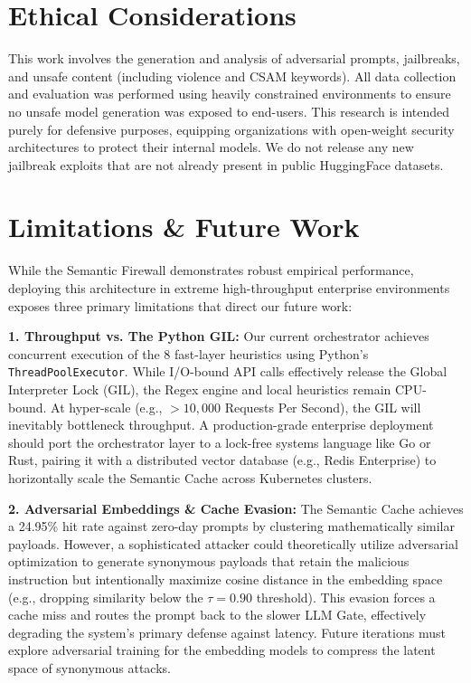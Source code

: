 \documentclass[12pt,a4paper]{article}
\begin{document}
\section{Ethical Considerations}

This work involves the generation and analysis of adversarial prompts, jailbreaks, and unsafe content (including violence and CSAM keywords). All data collection and evaluation was performed using heavily constrained environments to ensure no unsafe model generation was exposed to end-users. This research is intended purely for defensive purposes, equipping organizations with open-weight security architectures to protect their internal models. We do not release any new jailbreak exploits that are not already present in public HuggingFace datasets.

\section{Limitations \& Future Work}

While the Semantic Firewall demonstrates robust empirical performance, deploying this architecture in extreme high-throughput enterprise environments exposes three primary limitations that direct our future work:

\textbf{1. Throughput vs. The Python GIL:} Our current orchestrator achieves concurrent execution of the 8 fast-layer heuristics using Python's \texttt{ThreadPoolExecutor}. While I/O-bound API calls effectively release the Global Interpreter Lock (GIL), the Regex engine and local heuristics remain CPU-bound. At hyper-scale (e.g., $>10{,}000$ Requests Per Second), the GIL will inevitably bottleneck throughput. A production-grade enterprise deployment should port the orchestrator layer to a lock-free systems language like Go or Rust, pairing it with a distributed vector database (e.g., Redis Enterprise) to horizontally scale the Semantic Cache across Kubernetes clusters.

\textbf{2. Adversarial Embeddings \& Cache Evasion:} The Semantic Cache achieves a 24.95\% hit rate against zero-day prompts by clustering mathematically similar payloads. However, a sophisticated attacker could theoretically utilize adversarial optimization to generate synonymous payloads that retain the malicious instruction but intentionally maximize cosine distance in the embedding space (e.g., dropping similarity below the $\tau=0.90$ threshold). This evasion forces a cache miss and routes the prompt back to the slower LLM Gate, effectively degrading the system's primary defense against latency. Future iterations must explore adversarial training for the embedding models to compress the latent space of synonymous attacks.
\end{document}
